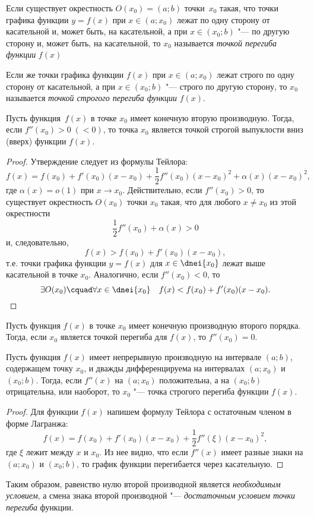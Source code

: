 \begin{defn}
Если существует окрестность $O(x_0)=(a;b)$ точки~$x_0$ такая, что точки графика функции $y=f(x)$ при $x\in (a;x_0)$ лежат по одну сторону от касательной и, может быть, на касательной, а при $x\in(x_0;b)$ "--- по другую сторону и, может быть, на касательной, то $x_0$ называется \textit{точкой перегиба функции} $f(x)$

Если же точки графика функции $f(x)$ при $x\in(a;x_0)$ лежат строго по одну сторону от касательной, а при $x\in (x_0;b)$ "--- строго по другую сторону, то $x_0$ называется \textit{точкой строгого перегиба функции} $f(x)$.
\end{defn}

\begin{thm}
Пусть функция~$f(x)$ в точке $x_0$ имеет конечную вторую производную. Тогда, если $f''(x_0)>0\; (<0)$, то точка $x_0$ является точкой строгой выпуклости вниз (вверх) функции $f(x)$. 
\end{thm}

\begin{proof}
Утверждение следует из формулы Тейлора:
$$
f(x)=f(x_0)+f'(x_0)(x-x_0)+\frac{1}{2}f''(x_0)(x-x_0)^2+\alpha(x)(x-x_0)^2,
$$
где $\alpha(x)=o(1)$ при $x\to x_0$. Действительно, если $f''(x_0)>0$, то существует окрестность $O(x_0)$ точки $x_0$ такая, что для любого $x\neq x_0$ из этой окрестности
$$
\frac{1}{2}f''(x_0)+\alpha(x)>0
$$
и, следовательно, 
$$
f(x)>f(x_0)+f'(x_0)(x-x_0),
$$
т.е. точки графика функции $y=f(x)$ для $x\in\dnei {x_0}$ лежат выше касательной в точке $x_0$. Аналогично, если $f''(x_0)<0$, то
\begin{equation*}
\exists O(x_0)\cquad \forall x\in \dnei {x_0} \quad f(x)<f(x_0)+f'(x_0)(x-x_0). \qedhere
\end{equation*}
\end{proof}

\begin{cons}
Пусть функция $f(x)$ в точке $x_0$ имеет конечную производную второго порядка. Тогда, если $x_0$ является точкой перегиба для $f(x)$, то $f''(x_0)=0$.
\end{cons}

\begin{thm}
Пусть функция $f(x)$ имеет непрерывную производную на интервале $(a;b)$, содержащем точку $x_0$, и дважды дифференцируема на интервалах $(a;x_0)$ и $(x_0;b)$. Тогда, если $f''(x)$ на $(a;x_0)$ положительна, а на $(x_0;b)$ отрицательна, или наоборот, то $x_0$ "--- точка строгого перегиба функции $f(x)$. 
\end{thm}

\begin{proof}
Для функции $f(x)$ напишем формулу Тейлора с остаточным членом в форме Лагранжа:
$$
f(x)=f(x_0)+f'(x_0)(x-x_0)+\frac{1}{2}f''(\xi)(x-x_0)^2,
$$
где $\xi$ лежит между $x$ и $x_0$. Из нее видно, что если $f''(x)$ имеет разные знаки на $(a;x_0)$ и $(x_0;b)$, то график функции перегибается через касательную.
\end{proof}

Таким образом, равенство нулю второй производной является \textit{необходимым условием}, а смена знака второй производной "--- \textit{достаточным условием точки перегиба} функции.
